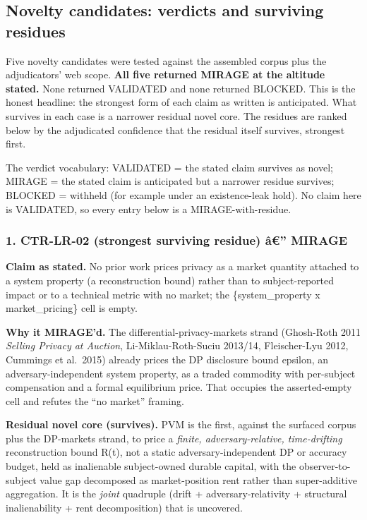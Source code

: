 \documentclass[
  11pt,
]{article}
\newcounter{none} %
\begin{document}
\subsection{Novelty candidates: verdicts and surviving
residues}\label{novelty-candidates-verdicts-and-surviving-residues}

Five novelty candidates were tested against the assembled corpus plus
the adjudicators' web scope. \textbf{All five returned MIRAGE at the
altitude stated.} None returned VALIDATED and none returned BLOCKED.
This is the honest headline: the strongest form of each claim as written
is anticipated. What survives in each case is a narrower residual novel
core. The residues are ranked below by the adjudicated confidence that
the residual itself survives, strongest first.

The verdict vocabulary: VALIDATED = the stated claim survives as novel;
MIRAGE = the stated claim is anticipated but a narrower residue
survives; BLOCKED = withheld (for example under an existence-leak hold).
No claim here is VALIDATED, so every entry below is a
MIRAGE-with-residue.

\subsubsection{1. CTR-LR-02 (strongest surviving residue) â€''
MIRAGE}\label{ctr-lr-02-strongest-surviving-residue-uxe2-mirage}

\textbf{Claim as stated.} No prior work prices privacy as a market
quantity attached to a system property (a reconstruction bound) rather
than to subject-reported impact or to a technical metric with no market;
the \{system\_property x market\_pricing\} cell is empty.

\textbf{Why it MIRAGE'd.} The differential-privacy-markets strand
(Ghosh-Roth 2011 \emph{Selling Privacy at Auction}, Li-Miklau-Roth-Suciu
2013/14, Fleischer-Lyu 2012, Cummings et al.~2015) already prices the DP
disclosure bound epsilon, an adversary-independent system property, as a
traded commodity with per-subject compensation and a formal equilibrium
price. That occupies the asserted-empty cell and refutes the ``no
market'' framing.

\textbf{Residual novel core (survives).} PVM is the first, against the
surfaced corpus plus the DP-markets strand, to price a \emph{finite,
adversary-relative, time-drifting} reconstruction bound R(t), not a
static adversary-independent DP or accuracy budget, held as inalienable
subject-owned durable capital, with the observer-to-subject value gap
decomposed as market-position rent rather than super-additive
aggregation. It is the \emph{joint} quadruple (drift +
adversary-relativity + structural inalienability + rent decomposition)
that is uncovered.
\end{document}
